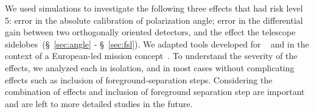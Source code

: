 \documentclass[PICOReport.tex]{subfiles}
\begin{document}
We used simulations to investigate the following three effects that had risk level 5: error in the absolute calibration of polarization angle; error in the differential gain between two orthogonally oriented detectors, and the effect the telescope sidelobes~(\S~\ref{sec:angle} - \S~\ref{sec:fsl}). We adapted tools developed for \planck~\cite{plank2015_xii_focalplane} and in the context of a European-led mission concept~\citep{core_systematics}. To understand the severity of the effects, we analyzed each in isolation, and in most cases without complicating effects such as inclusion of foreground-separation steps. Considering the combination of effects and inclusion of foreground separation step are important and are left to more detailed studies in the future. 


%

\end{document}
